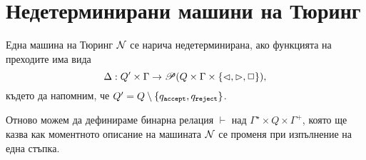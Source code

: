 \section{Недетерминирани машини на Тюринг}

Една машина на Тюринг $\N$ се нарича недетерминирана, ако функцията на преходите има вида
\[\Delta: Q'\times \Gamma \to \Ps(Q \times \Gamma\times \{\goleft,\goright,\stay\}), \]
където да напомним, че $Q' = Q \setminus \{\qaccept,\qreject\}$.

Отново можем да дефинираме бинарна релация $\vdash$ над $\Gamma^\star \times Q \times \Gamma^+$,
която ще казва как моментното описание на машината $\N$ се променя при изпълнение на една стъпка.

\begin{important}
\begin{figure}[H]
  \begin{subfigure}[b]{0.5\textwidth}
    \begin{prooftree}
    \end{prooftree}
    \vspace*{2mm}
  \end{subfigure}
  ~
  \begin{subfigure}[b]{0.5\textwidth}
    \begin{prooftree}
    \end{prooftree}
    \vspace*{2mm}
  \end{subfigure}
  
  \begin{subfigure}[b]{0.5\textwidth}
    \begin{prooftree}
    \end{prooftree}
    \vspace*{2mm}
  \end{subfigure}
  ~
  \begin{subfigure}[b]{0.5\textwidth}
    \begin{prooftree}
    \end{prooftree}
    \vspace*{2mm}
  \end{subfigure}
  

\end{figure}
\end{important}
